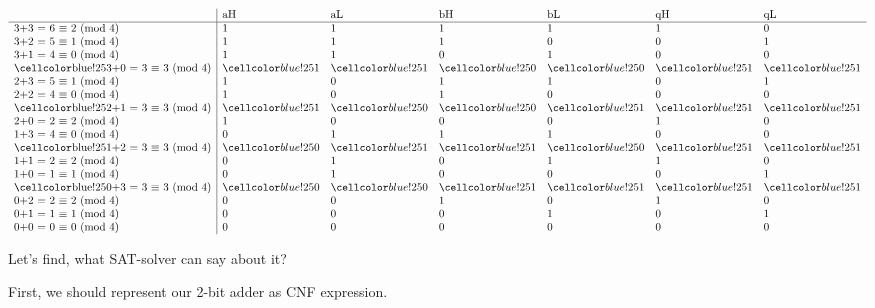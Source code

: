 \begin{center}
\begin{doublespace}
\noindent\(\begin{array}{l|llllll}
  & \text{aH} & \text{aL} & \text{bH} & \text{bL} & \text{qH} & \text{qL} \\
\hline
 \text{3+3 = 6 $\equiv $ 2 (mod 4)} & 1 & 1 & 1 & 1 & 1 & 0 \\
 \text{3+2 = 5 $\equiv $ 1 (mod 4)} & 1 & 1 & 1 & 0 & 0 & 1 \\
 \text{3+1 = 4 $\equiv $ 0 (mod 4)} & 1 & 1 & 0 & 1 & 0 & 0 \\
 \text{\HLcell{}3+0 = 3 $\equiv $ 3 (mod 4)} & \HLcell{}1 & \HLcell{}1 & \HLcell{}0 & \HLcell{}0 & \HLcell{}1 & \HLcell{}1 \\
 \text{2+3 = 5 $\equiv $ 1 (mod 4)} & 1 & 0 & 1 & 1 & 0 & 1 \\
 \text{2+2 = 4 $\equiv $ 0 (mod 4)} & 1 & 0 & 1 & 0 & 0 & 0 \\
 \text{\HLcell{}2+1 = 3 $\equiv $ 3 (mod 4)} & \HLcell{}1 & \HLcell{}0 & \HLcell{}0 & \HLcell{}1 & \HLcell{}1 & \HLcell{}1 \\
 \text{2+0 = 2 $\equiv $ 2 (mod 4)} & 1 & 0 & 0 & 0 & 1 & 0 \\
 \text{1+3 = 4 $\equiv $ 0 (mod 4)} & 0 & 1 & 1 & 1 & 0 & 0 \\
 \text{\HLcell{}1+2 = 3 $\equiv $ 3 (mod 4)} & \HLcell{}0 & \HLcell{}1 & \HLcell{}1 & \HLcell{}0 & \HLcell{}1 & \HLcell{}1 \\
 \text{1+1 = 2 $\equiv $ 2 (mod 4)} & 0 & 1 & 0 & 1 & 1 & 0 \\
 \text{1+0 = 1 $\equiv $ 1 (mod 4)} & 0 & 1 & 0 & 0 & 0 & 1 \\
 \text{\HLcell{}0+3 = 3 $\equiv $ 3 (mod 4)} & \HLcell{}0 & \HLcell{}0 & \HLcell{}1 & \HLcell{}1 & \HLcell{}1 & \HLcell{}1 \\
 \text{0+2 = 2 $\equiv $ 2 (mod 4)} & 0 & 0 & 1 & 0 & 1 & 0 \\
 \text{0+1 = 1 $\equiv $ 1 (mod 4)} & 0 & 0 & 0 & 1 & 0 & 1 \\
 \text{0+0 = 0 $\equiv $ 0 (mod 4)} & 0 & 0 & 0 & 0 & 0 & 0 \\
\end{array}\)
\end{doublespace}
\end{center}

Let's find, what SAT-solver can say about it?

First, we should represent our 2-bit adder as CNF expression.

